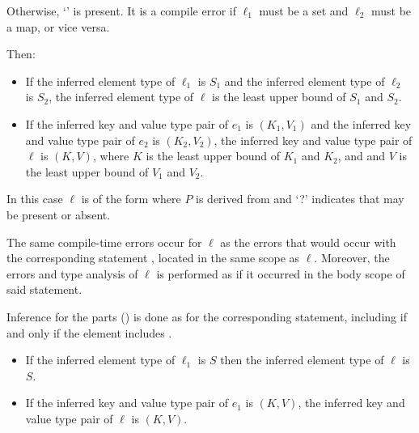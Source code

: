 \documentclass[makeidx]{article}
\begin{document}
{Otherwise, `' is present.
It is a compile error if $\ell_1$ must be a set and $\ell_2$ must be a map,
or vice versa.


Then:

\begin{itemize}
\item
  If the inferred element type of $\ell_1$ is $S_1$ and
  the inferred element type of $\ell_2$ is $S_2$,
  the inferred element type of $\ell$ is
  the least upper bound of $S_1$ and $S_2$.
\item
  If the inferred key and value type pair of $e_1$ is
  $(K_1, V_1)$
  and the inferred key and value type pair of $e_2$ is
  $(K_2, V_2)$,
  the inferred key and value type pair of $\ell$ is
  $(K, V)$,
  where $K$ is the least upper bound of $K_1$ and $K_2$, and
  and $V$ is the least upper bound of $V_1$ and $V_2$.
\end{itemize}
\vspace{-5mm}
\EndCase

\LMHash{}%
In this case $\ell$ is of the form
where $P$ is derived from  and
`\AWAIT?' indicates that \AWAIT{} may be present or absent.

The same compile-time errors occur for $\ell$ as
the errors that would occur with the corresponding \FOR{} statement
,
located in the same scope as $\ell$.
Moreover, the errors and type analysis of $\ell$ is performed
as if it occurred in the body scope of said \FOR{} statement.


Inference for the parts
()
is done as for the corresponding \FOR{} statement,
including \AWAIT{} if and only if the element includes \AWAIT.

\begin{itemize}
\item
  If the inferred element type of $\ell_1$ is $S$ then
  the inferred element type of $\ell$ is $S$.
\item
  If the inferred key and value type pair of $e_1$ is $(K, V)$,
  the inferred key and value type pair of $\ell$ is $(K, V)$.
\end{itemize}

}
\end{document}
